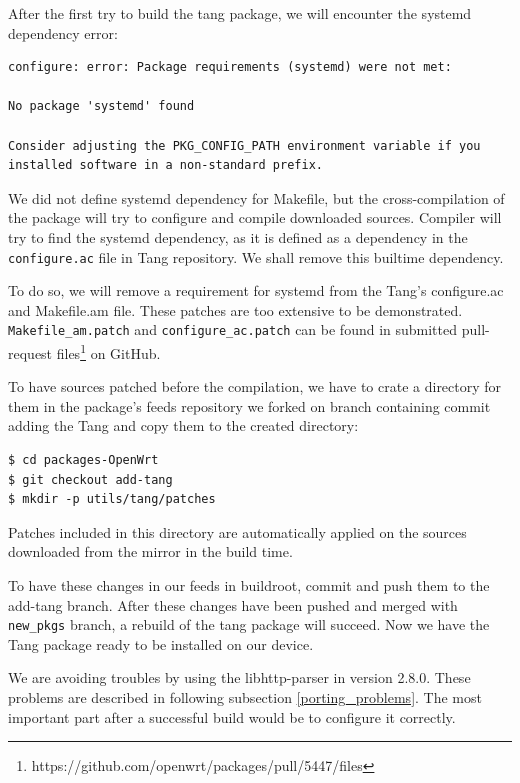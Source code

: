 After the first try to build the tang package, we will encounter the systemd dependency error:
\begin{lstlisting}[columns=fixed,basicstyle=\ttfamily\footnotesize,tabsize=4,backgroundcolor=\color{yellow!10}]
configure: error: Package requirements (systemd) were not met:

No package 'systemd' found

Consider adjusting the PKG_CONFIG_PATH environment variable if you
installed software in a non-standard prefix.
\end{lstlisting}
We did not define systemd dependency for Makefile, but the cross-compilation of the package will try to configure and compile downloaded sources.
Compiler will try to find the systemd dependency, as it is defined as a dependency in the {\tt configure.ac} file in Tang repository.
We shall remove this builtime dependency.

To do so, we will remove a requirement for systemd from the Tang's configure.ac and Makefile.am file.
These patches are too extensive to be demonstrated.
{\tt Makefile\_am.patch} and {\tt configure\_ac.patch} can be found in submitted pull-request files\footnote{https://github.com/openwrt/packages/pull/5447/files} on GitHub.

To have sources patched before the compilation, we have to crate a directory for them in the package's feeds repository we forked on branch containing commit adding the Tang and copy them to the created directory:
\begin{lstlisting}[columns=fixed,basicstyle=\ttfamily\footnotesize,tabsize=4,backgroundcolor=\color{yellow!10}]
$ cd packages-OpenWrt
$ git checkout add-tang
$ mkdir -p utils/tang/patches
\end{lstlisting}
Patches included in this directory are automatically applied on the sources downloaded from the mirror in the build time.

To have these changes in our feeds in buildroot, commit and push them to the add-tang branch.
After these changes have been pushed and merged with {\tt new\_pkgs} branch, a rebuild of the tang package will succeed.
Now we have the Tang package ready to be installed on our device.

We are avoiding troubles by using the libhttp-parser in version 2.8.0.
These problems are described in following subsection \ref{porting_problems}.
The most important part after a successful build would be to configure it correctly.



